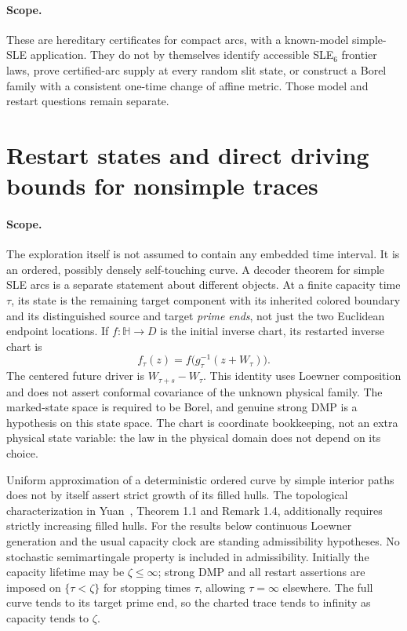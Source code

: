 \documentclass[11pt]{article}
\theoremstyle{definition}\newtheorem{definition}[theorem]{Definition}
\theoremstyle{remark}\newtheorem{remark}[theorem]{Remark}
\begin{document}
\paragraph{Scope.}
These are hereditary certificates for compact arcs, with a known-model
simple-SLE application. They do not by themselves identify accessible
SLE$_6$ frontier laws, prove certified-arc supply at every random slit
state, or construct a Borel family with a consistent one-time change
of affine metric. Those model and restart questions remain separate.


\section{Restart states and direct driving bounds for nonsimple traces}
\label{sec:nonsimple-direct-bounds}

\paragraph{Scope.}
The exploration itself is not assumed to contain any embedded time
interval. It is an ordered, possibly densely self-touching curve. A
decoder theorem for simple SLE arcs is a separate statement about
different objects. At a finite capacity time $\tau$, its state is the
remaining target component with its inherited colored boundary and its
distinguished source and target \emph{prime ends}, not just the two
Euclidean endpoint locations. If $f:\mathbb H\to D$ is the initial
inverse chart, its restarted inverse chart is
\[
 f_\tau(z)=f\bigl(g_\tau^{-1}(z+W_\tau)\bigr).
 \tag{NS1}
\]
The centered future driver is $W_{\tau+s}-W_\tau$. This identity uses
Loewner composition and does not assert conformal covariance of the
unknown physical family. The marked-state space is required to be Borel,
and genuine strong DMP is a hypothesis on this state space. The chart
is coordinate bookkeeping, not an extra physical state variable:
the law in the physical domain does not depend on its choice.

Uniform approximation of a deterministic ordered curve by simple
interior paths does not by itself assert strict growth of its filled
hulls. The topological characterization in Yuan~\cite{yuan}, Theorem 1.1 and
Remark 1.4, additionally requires strictly increasing filled hulls.
For the results below continuous Loewner generation and the usual
capacity clock are standing admissibility hypotheses. No stochastic
semimartingale property is included in admissibility. Initially the
capacity lifetime may be $\zeta\le\infty$; strong DMP and all
restart assertions are imposed on $\{\tau<\zeta\}$ for stopping times
$\tau$, allowing $\tau=\infty$ elsewhere. The full curve tends to its target prime end, so the charted
trace tends to infinity as capacity tends to $\zeta$.
\end{document}
